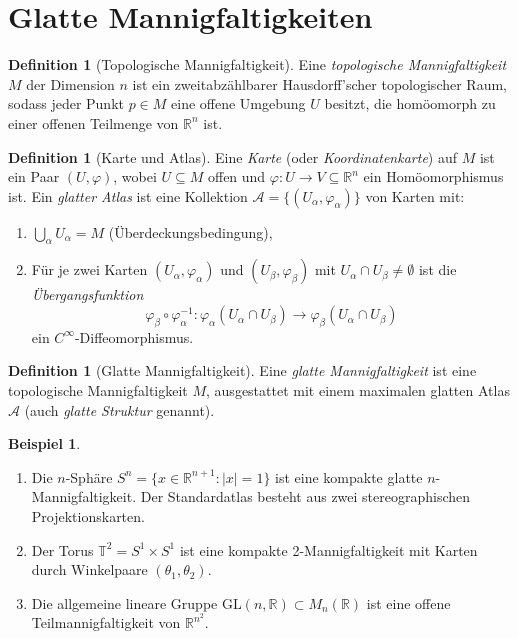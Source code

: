 \documentclass[12pt,a4paper]{amsart}
\theoremstyle{definition}
\newtheorem{definition}[theorem]{Definition}
\newtheorem{beispiel}[theorem]{Beispiel}
\begin{document}
\section{Glatte Mannigfaltigkeiten}
\label{sec:mannigfaltigkeiten}

\begin{definition}[Topologische Mannigfaltigkeit]
Eine \emph{topologische Mannigfaltigkeit} $M$ der Dimension $n$ ist ein
zweitabzählbarer Hausdorff'scher topologischer Raum, sodass jeder Punkt
$p \in M$ eine offene Umgebung $U$ besitzt, die homöomorph zu einer
offenen Teilmenge von $\mathbb{R}^n$ ist.
\end{definition}

\begin{definition}[Karte und Atlas]
Eine \emph{Karte} (oder \emph{Koordinatenkarte}) auf $M$ ist ein Paar
$(U, \varphi)$, wobei $U \subseteq M$ offen und $\varphi: U \to V \subseteq \mathbb{R}^n$
ein Homöomorphismus ist. Ein \emph{glatter Atlas} ist eine Kollektion
$\mathcal{A} = \{(U_\alpha, \varphi_\alpha)\}$ von Karten mit:
\begin{enumerate}[label=(\roman*)]
  \item $\bigcup_\alpha U_\alpha = M$ (Überdeckungsbedingung),
  \item Für je zwei Karten $(U_\alpha, \varphi_\alpha)$ und
        $(U_\beta, \varphi_\beta)$ mit $U_\alpha \cap U_\beta \neq \emptyset$
        ist die \emph{Übergangsfunktion}
        \[
          \varphi_\beta \circ \varphi_\alpha^{-1}:
          \varphi_\alpha(U_\alpha \cap U_\beta) \to
          \varphi_\beta(U_\alpha \cap U_\beta)
        \]
        ein $C^\infty$-Diffeomorphismus.
\end{enumerate}
\end{definition}

\begin{definition}[Glatte Mannigfaltigkeit]
Eine \emph{glatte Mannigfaltigkeit} ist eine topologische Mannigfaltigkeit $M$,
ausgestattet mit einem maximalen glatten Atlas $\mathcal{A}$ (auch
\emph{glatte Struktur} genannt).
\end{definition}

\begin{beispiel}
\begin{enumerate}[label=(\alph*)]
  \item Die $n$-Sphäre $S^n = \{x \in \mathbb{R}^{n+1} : |x| = 1\}$ ist eine
        kompakte glatte $n$-Mannigfaltigkeit. Der Standardatlas besteht aus
        zwei stereographischen Projektionskarten.
  \item Der Torus $\mathbb{T}^2 = S^1 \times S^1$ ist eine kompakte 2-Mannigfaltigkeit
        mit Karten durch Winkelpaare $(\theta_1, \theta_2)$.
  \item Die allgemeine lineare Gruppe $\mathrm{GL}(n, \mathbb{R}) \subset M_n(\mathbb{R})$
        ist eine offene Teilmannigfaltigkeit von $\mathbb{R}^{n^2}$.
\end{enumerate}
\end{beispiel}
\end{document}

